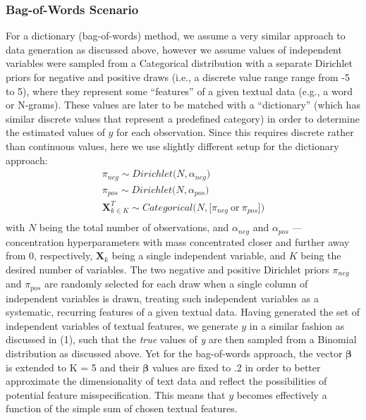 \documentclass[man, 12pt, a4paper, nolmodern, noextraspace]{apa6}
\begin{document}
    \subsubsection{Bag-of-Words Scenario}
     For a dictionary (bag-of-words) method, we assume a very similar approach to data generation as discussed above, however we assume values of independent variables were sampled from a Categorical distribution with a separate Dirichlet priors for negative and positive draws (i.e., a discrete value range range from -5 to 5), where they represent some \enquote{features} of a given textual data (e.g., a word or N-grams). These values are later to be matched with a \enquote{dictionary} (which has similar discrete values that represent a predefined category) in order to determine the estimated values of $y$ for each observation. Since this requires discrete rather than continuous values, here we use slightly different setup for the dictionary approach:
       \begin{equation}
        \begin{gathered}
            \pi_{neg} \sim Dirichlet\bigl(N, \alpha_{neg}\bigr) \\
            \pi_{pos} \sim Dirichlet\bigl(N, \alpha_{pos}\bigr) \\
            \boldsymbol{X}_{k \in K}^T \sim Categorical\bigl(N, \bigl[\pi_{neg}\ \textrm{or}\ \pi_{pos}\bigr]\bigr) \\
        \end{gathered}
    \end{equation}
    \noindent with $N$ being the total number of observations, and $\alpha_{neg}$ and $\alpha_{pos}$ --- concentration hyperparameters with mass concentrated closer and further away from 0, respectively, $\boldsymbol{X}_k$ being a single independent variable, and $K$ being the desired number of variables. The two negative and positive Dirichlet priors $\pi_{neg}$ and $\pi_{pos}$ are randomly selected for each draw when a single column of independent variables is drawn, treating such independent variables as a systematic, recurring features of a given textual data. Having generated the set of independent variables of textual features, we generate $y$ in a similar fashion as discussed in (1), such that the \textit{true} values of \textit{y} are then sampled from a Binomial distribution as discussed above. Yet for the bag-of-words approach, the vector $\boldsymbol{\beta}$ is extended to K = 5 and their $\boldsymbol{\beta}$ values are fixed to .2 in order to better approximate the dimensionality of text data and reflect the possibilities of potential feature misspecification. This means that $y$ becomes effectively a function of the simple sum of chosen textual features. 
\end{document}
